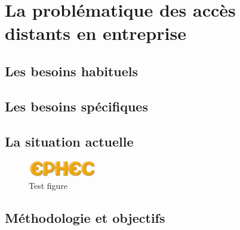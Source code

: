 \chapter{La problématique des accès distants en entreprise}
\section{Les besoins habituels}
\section{Les besoins spécifiques}
\section{La situation actuelle}
\begin{figure}
\includegraphics{ephec.png}
\caption{Test figure}
\end{figure}
\section{Méthodologie et objectifs}